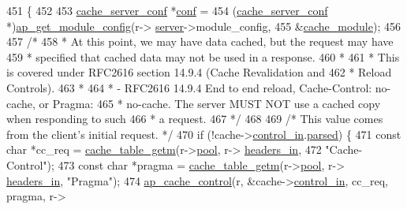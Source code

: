\begin{DoxyCode}
451 \{
452 
453     \hyperlink{structcache__server__conf}{cache\_server\_conf} *\hyperlink{group__APACHE__CORE__HTTPD_ga7be6dfd9155648f64d6e9abcd78c38cd}{conf} =
454       (\hyperlink{structcache__server__conf}{cache\_server\_conf} *)\hyperlink{group__APACHE__CORE__CONFIG_ga1093a5908a384eacc929b028c79f2a02}{ap\_get\_module\_config}(r->
      \hyperlink{structrequest__rec_a4a8059930ce9409cb885fdeef6921b7b}{server}->module\_config,
455                                                 &\hyperlink{mod__cache_8c_a315b551bc967794e90417b5538a128f1}{cache\_module});
456 
457     \textcolor{comment}{/*}
458 \textcolor{comment}{     * At this point, we may have data cached, but the request may have}
459 \textcolor{comment}{     * specified that cached data may not be used in a response.}
460 \textcolor{comment}{     *}
461 \textcolor{comment}{     * This is covered under RFC2616 section 14.9.4 (Cache Revalidation and}
462 \textcolor{comment}{     * Reload Controls).}
463 \textcolor{comment}{     *}
464 \textcolor{comment}{     * - RFC2616 14.9.4 End to end reload, Cache-Control: no-cache, or Pragma:}
465 \textcolor{comment}{     * no-cache. The server MUST NOT use a cached copy when responding to such}
466 \textcolor{comment}{     * a request.}
467 \textcolor{comment}{     */}
468 
469     \textcolor{comment}{/* This value comes from the client's initial request. */}
470     \textcolor{keywordflow}{if} (!cache->\hyperlink{structcache__request__rec_aaea78b272eb05f1ba67a75bd6264b4df}{control\_in}.\hyperlink{structcache__control_a386401082305485525836ed568c6b46a}{parsed}) \{
471         \textcolor{keyword}{const} \textcolor{keywordtype}{char} *cc\_req = \hyperlink{group__Cache__util_ga46b2ea303b9ec2767a61d0f121835b43}{cache\_table\_getm}(r->\hyperlink{structrequest__rec_aa0a0c16f9a9ab3901cdb3f3c9c9d83d0}{pool}, r->
      \hyperlink{structrequest__rec_a5497da6c01af49acf70a4a9b975c1c83}{headers\_in},
472                 \textcolor{stringliteral}{"Cache-Control"});
473         \textcolor{keyword}{const} \textcolor{keywordtype}{char} *pragma = \hyperlink{group__Cache__util_ga46b2ea303b9ec2767a61d0f121835b43}{cache\_table\_getm}(r->\hyperlink{structrequest__rec_aa0a0c16f9a9ab3901cdb3f3c9c9d83d0}{pool}, r->
      \hyperlink{structrequest__rec_a5497da6c01af49acf70a4a9b975c1c83}{headers\_in}, \textcolor{stringliteral}{"Pragma"});
474         \hyperlink{group__MOD__CACHE_ga22e3955e21c6e60450101eb1e3c6919b}{ap\_cache\_control}(r, &cache->\hyperlink{structcache__request__rec_aaea78b272eb05f1ba67a75bd6264b4df}{control\_in}, cc\_req, pragma, r->

\end{DoxyCode}
